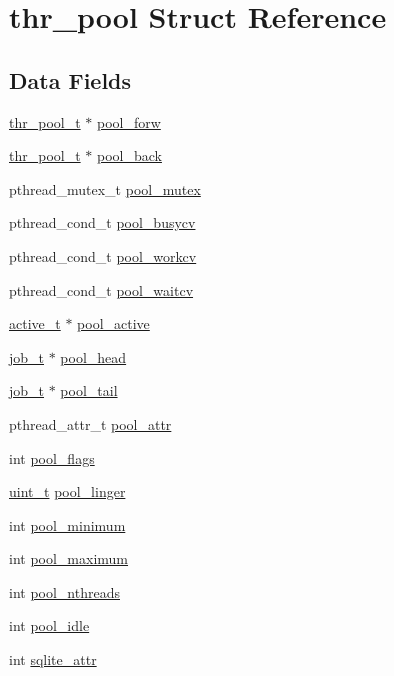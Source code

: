 \hypertarget{structthr__pool}{
\section{thr\_\-pool Struct Reference}
\label{structthr__pool}
}
\subsection*{Data Fields}
\begin{DoxyCompactItemize}
\item 
\hyperlink{structthr__pool}{thr\_\-pool\_\-t} $\ast$ \hyperlink{structthr__pool_a05fe5ead5a8e193468e6110d8b9ddee8}{pool\_\-forw}
\item 
\hyperlink{structthr__pool}{thr\_\-pool\_\-t} $\ast$ \hyperlink{structthr__pool_aa5d3015bfd8e1a18ccb9bc5017d40135}{pool\_\-back}
\item 
pthread\_\-mutex\_\-t \hyperlink{structthr__pool_ac79efd45606cb0611634b02e85fbc334}{pool\_\-mutex}
\item 
pthread\_\-cond\_\-t \hyperlink{structthr__pool_aedcb82844d345ef36cff542809203824}{pool\_\-busycv}
\item 
pthread\_\-cond\_\-t \hyperlink{structthr__pool_ad6d898706dd4c525dc6227e5f89f7ddf}{pool\_\-workcv}
\item 
pthread\_\-cond\_\-t \hyperlink{structthr__pool_a49cb54e317337da95c19ead99fd0289f}{pool\_\-waitcv}
\item 
\hyperlink{structactive}{active\_\-t} $\ast$ \hyperlink{structthr__pool_a22cb592fd33f720c56b20a726deb5d2a}{pool\_\-active}
\item 
\hyperlink{structjob}{job\_\-t} $\ast$ \hyperlink{structthr__pool_a4080e65fa1cd1011a9037223de630b31}{pool\_\-head}
\item 
\hyperlink{structjob}{job\_\-t} $\ast$ \hyperlink{structthr__pool_a736e49f5e6628b0288595c6dc73a3202}{pool\_\-tail}
\item 
pthread\_\-attr\_\-t \hyperlink{structthr__pool_ad0681ae3f8bda7f85b669bf7940777ef}{pool\_\-attr}
\item 
int \hyperlink{structthr__pool_af8063de86663bedc6827513d88e8b848}{pool\_\-flags}
\item 
\hyperlink{thr__pool_8h_a12a1e9b3ce141648783a82445d02b58d}{uint\_\-t} \hyperlink{structthr__pool_a9d3ae71becdd8ad534d012603dc07645}{pool\_\-linger}
\item 
int \hyperlink{structthr__pool_ab6687bfd1308009028b86f337cf21573}{pool\_\-minimum}
\item 
int \hyperlink{structthr__pool_a9161c1f5dd18fe7d6e482363c65614ce}{pool\_\-maximum}
\item 
int \hyperlink{structthr__pool_a6304d8a2606cef0f561765808aa0b68d}{pool\_\-nthreads}
\item 
int \hyperlink{structthr__pool_a3b04e8be2ae1ef51809a8bda0c838c5c}{pool\_\-idle}
\item 
int \hyperlink{structthr__pool_a07889f76b9822774b2a2a50c91701d71}{sqlite\_\-attr}
\end{DoxyCompactItemize}


